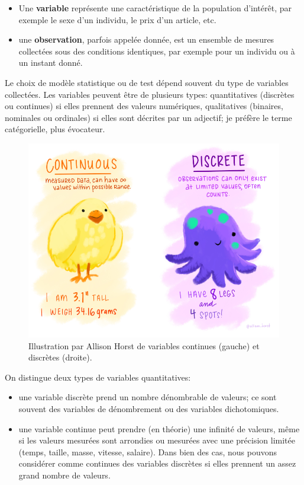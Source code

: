 \documentclass[
  11pt,
  letterpaper,
]{book}
\providecommand{\tightlist}{%
  \setlength{\itemsep}{0pt}\setlength{\parskip}{0pt}}
\theoremstyle{definition}
\theoremstyle{definition}
\theoremstyle{definition}
\theoremstyle{definition}
\theoremstyle{remark}
\begin{document}
\begin{itemize}
\tightlist
\item
  Une \textbf{variable} représente une caractéristique de la population d'intérêt, par exemple le sexe d'un individu, le prix d'un article, etc.
\item
  une \textbf{observation}, parfois appelée donnée, est un ensemble de mesures collectées sous des conditions identiques, par exemple pour un individu ou à un instant donné.
\end{itemize}

Le choix de modèle statistique ou de test dépend souvent du type de variables collectées. Les variables peuvent être de plusieurs types: quantitatives (discrètes ou continues) si elles prennent des valeurs numériques, qualitatives (binaires, nominales ou ordinales) si elles sont décrites par un adjectif; je préfère le terme catégorielle, plus évocateur.

\begin{figure}

{\centering \includegraphics[width=0.7\linewidth]{figures/continuous_discrete} 

}

\caption{Illustration par Allison Horst de variables continues (gauche) et discrètes (droite).}\label{fig:variablesquanti}
\end{figure}

On distingue deux types de variables quantitatives:

\begin{itemize}
\tightlist
\item
  une variable discrète prend un nombre dénombrable de valeurs; ce sont souvent des variables de dénombrement ou des variables dichotomiques.
\item
  une variable continue peut prendre (en théorie) une infinité de valeurs, même si les valeurs mesurées sont arrondies ou mesurées avec une précision limitée (temps, taille, masse, vitesse, salaire). Dans bien des cas, nous pouvons considérer comme continues des variables discrètes si elles prennent un assez grand nombre de valeurs.
\end{itemize}
\end{document}
